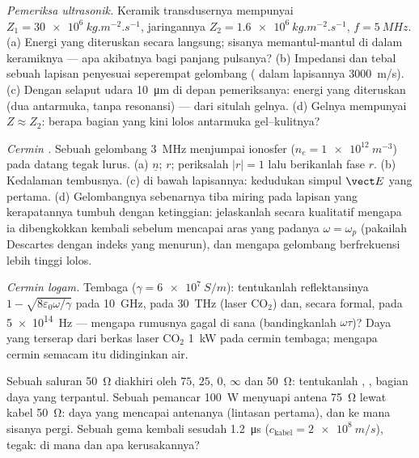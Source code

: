 \begin{exercise}[$\star\star$]\label{exo:b2:wave-interfaces:6}
\emph{Pemeriksa ultrasonik.} Keramik transdusernya mempunyai $Z_1 = \qty{30e6}{kg.m^{-2}.s^{-1}}$,
jaringannya $Z_2 = \qty{1.6e6}{kg.m^{-2}.s^{-1}}$, $f = \qty{5}{MHz}$. (a) Energi
yang diteruskan secara langsung; sisanya memantul-mantul di dalam keramiknya --- apa
akibatnya bagi panjang pulsanya? (b) Impedansi dan tebal sebuah
lapisan penyesuai seperempat gelombang ( dalam lapisannya \qty{3000}{m/s}).
(c) Dengan selaput udara \qty{10}{\micro m} di depan pemeriksanya: energi
yang diteruskan (dua antarmuka, tanpa resonansi) --- dari situlah gelnya. (d)
Gelnya mempunyai $Z \approx Z_2$: berapa bagian yang kini lolos antarmuka gel--kulitnya?
\end{exercise}

\begin{exercise}[$\star\star$]\label{exo:b2:wave-interfaces:7}
\emph{Cermin .} Sebuah gelombang \qty{3}{MHz} menjumpai ionosfer ($n_e =
\qty{1e12}{m^{-3}}$) pada datang tegak lurus. (a) $\underline n$; $r$; periksalah $|r| = 1$ lalu
berikanlah fase $r$. (b) Kedalaman tembusnya. (c)  di bawah
lapisannya: kedudukan simpul $\vect E$ yang pertama. (d) Gelombangnya sebenarnya
tiba miring pada lapisan yang kerapatannya tumbuh dengan ketinggian: jelaskanlah
secara kualitatif mengapa ia dibengkokkan kembali sebelum mencapai aras yang padanya
$\omega = \omega_p$ (pakailah Descartes dengan indeks yang menurun), dan mengapa gelombang
berfrekuensi lebih tinggi lolos.
\end{exercise}

\begin{exercise}[$\star\star$]\label{exo:b2:wave-interfaces:8}
\emph{Cermin logam.} Tembaga ($\gamma = \qty{6e7}{S/m}$): tentukanlah reflektansinya $1 -
\sqrt{8\varepsilon_0\omega/\gamma}$ pada \qty{10}{GHz}, pada \qty{30}{THz} (laser CO$_2$) dan,
secara formal, pada \qty{5e14}{Hz} --- mengapa rumusnya gagal di sana (bandingkanlah
$\omega\tau$)? Daya yang terserap dari berkas laser CO$_2$ \qty{1}{kW} pada cermin
tembaga; mengapa cermin semacam itu didinginkan air.
\end{exercise}

\begin{exercise}[$\star\star$]\label{exo:b2:wave-interfaces:9}
Sebuah saluran \qty{50}{\ohm} diakhiri oleh $75$, $25$, $0$, $\infty$ dan \qty{50}{\ohm}:
tentukanlah , , bagian daya yang
terpantul. Sebuah pemancar \qty{100}{W} menyuapi antena \qty{75}{\ohm}
lewat kabel \qty{50}{\ohm}: daya yang mencapai antenanya (lintasan pertama),
dan ke mana sisanya pergi. Sebuah gema kembali sesudah \qty{1.2}{\micro s} ($c_{\text{kabel}}
= \qty{2e8}{m/s}$), tegak: di mana dan apa kerusakannya?
\end{exercise}

